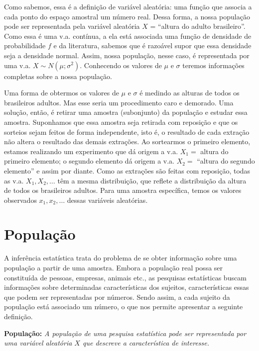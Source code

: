 \documentclass[
]{book}
\begin{document}
Como sabemos, essa é a definição de variável aleatória: uma função que associa a cada ponto do espaço amostral um número real. Dessa forma, a nossa população pode ser representada pela variável aleatória \(X\) = ``altura do adulto brasileiro''. Como essa é uma v.a. contínua, a ela está associada uma função de densidade de probabilidade \(f\) e da literatura, sabemos que é razoável supor que essa densidade seja a densidade normal. Assim, nossa população, nesse caso, é representada por uma v.a. \(X\sim N(\mu; \sigma^2)\). Conhecendo os valores de \(\mu\) e \(\sigma\) teremos informações completas sobre a nossa população.

Uma forma de obtermos os valores de \(\mu\) e \(\sigma\) é medindo as alturas de todos os brasileiros adultos. Mas esse seria um procedimento caro e demorado. Uma solução, então, é retirar uma amostra (subonjunto) da população e estudar essa amostra. Suponhamos que essa amostra seja retirada com reposição e que os sorteios sejam feitos de forma independente, isto é, o resultado de cada extração não altera o resultado das demais extrações. Ao sortearmos o primeiro elemento, estamos realizando um experimento que dá origem a v.a. \(X_1=\) altura do primeiro elemento; o segundo elemento dá origem a v.a. \(X_2=\) ``altura do segundo elemento'' e assim por diante. Como as extrações são feitas com reposição, todas as v.a. \(X_1, X_2, \ldots\) têm a mesma distribuição, que reflete a distribuição da altura de todos os brasileiros adultos. Para uma amostra específica, temos os valores observados \(x_1, x_2, \ldots\) dessas variáveis aleatórias.

\hypertarget{populauxe7uxe3o}{%
\section{População}\label{populauxe7uxe3o}}

A inferência estatística trata do problema de se obter informação sobre uma população a partir de uma amostra. Embora a população real possa ser constituída de pessoas, empresas, animais etc., as pesquisas estatísticas buscam informações sobre determinadas características dos sujeitos, características essas que podem ser representadas por números. Sendo assim, a cada sujeito da população está associado um número, o que nos permite apresentar a seguinte definição.

\textbf{População:} \emph{A população de uma pesquisa estatística pode ser representada por uma variável aleatória $X$ que descreve a característica de interesse.}
\end{document}
